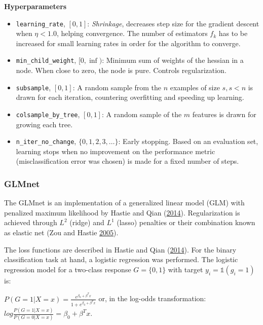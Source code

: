\documentclass[
  11pt,
  a4paper,
  DIV=12,captions=tableheading,oneside,titlepage]{scrbook}
\providecommand{\tightlist}{%
  \setlength{\itemsep}{0pt}\setlength{\parskip}{0pt}}
\begin{document}
\textbf{Hyperparameters}

\begin{itemize}
\tightlist
\item
  \texttt{learning\_rate}, \([0, 1]\): \emph{Shrinkage}, decreases step size for the gradient descent when \(\eta < 1.0\), helping convergence. The number of estimators \(f_k\) has to be increased for small learning rates in order for the algorithm to converge.
\item
  \texttt{min\_child\_weight}, \([0, \inf)\): Minimum sum of weights of the hessian in a node. When close to zero, the node is pure. Controls regularization.
\item
  \texttt{subsample}, \([0, 1]\): A random sample from the \(n\) examples of size \(s, s < n\) is drawn for each iteration, countering overfitting and speeding up learning.
\item
  \texttt{colsample\_by\_tree}, \([0, 1]\): A random sample of the \(m\) features is drawn for growing each tree.
\item
  \texttt{n\_iter\_no\_change}, \(\{0,1,2,3, \ldots\}\): Early stopping. Based on an evaluation set, learning stops when no improvement on the performance metric (misclassification error was chosen) is made for a fixed number of steps.
\end{itemize}

\hypertarget{glmnet}{%
\subsubsection{GLMnet}\label{glmnet}}

The GLMnet is an implementation of a generalized linear model (GLM) with penalized maximum likelihood by Hastie and Qian (\protect\hyperlink{ref-hastie2014glmnet}{2014}). Regularization is achieved through \(L^2\) (ridge) and \(L^1\) (lasso) penalties or their combination known as elastic net (Zou and Hastie \protect\hyperlink{ref-zou2005regularization}{2005}).

The loss functions are described in Hastie and Qian (\protect\hyperlink{ref-hastie2014glmnet}{2014}). For the binary classification task at hand, a logistic regression was performed. The logistic regression model for a two-class response \(G = \{0,1\}\) with target \(y_i = \mathbb{1}(g_i=1)\) is:

\(P(G=1|X=x) = \frac{e^{\beta_0+\beta^Tx}}{1+e^{\beta_0+\beta^Tx}}\) or, in the log-odds transformation: \(log\frac{P(G=1|X=x)}{P(G=0|X=x)}=\beta_0+\beta^Tx\).
\end{document}
